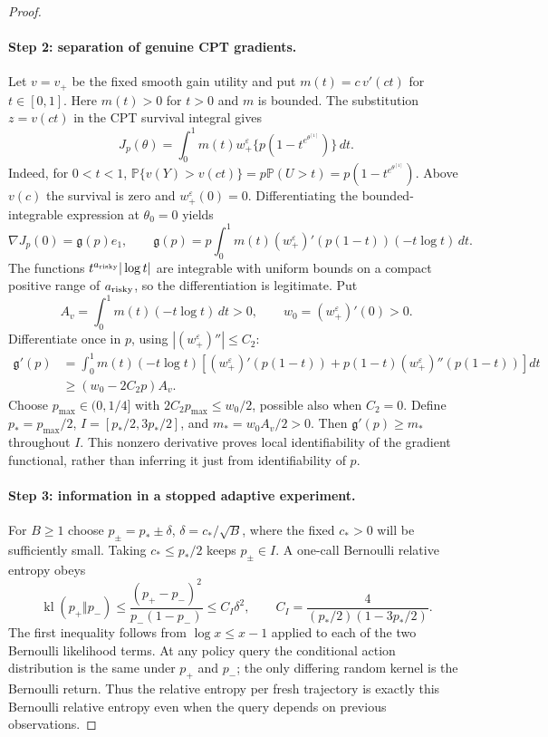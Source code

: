\documentclass[11pt]{article}
\newcommand{\Pp}{\mathbb P}
\newcommand{\1}{\mathbf 1}
\newcommand{\eps}{\varepsilon}
\begin{document}
\begin{proof}
\paragraph{Step 2: separation of genuine CPT gradients.}
Let $v=v_+$ be the fixed smooth gain utility and put $m(t)=c\,v'(ct)$ for $t\in[0,1]$. Here $m(t)>0$ for $t>0$ and $m$ is bounded. The substitution $z=v(ct)$ in the CPT survival integral gives
\begin{equation}\label{eq:submodel-cpt}
 J_p(\theta)=\int_0^1 m(t)w_+^\eps\{p(1-t^{e^{\theta^{[1]}}})\}\,dt.
\end{equation}
Indeed, for $0<t<1$, $\Pp\{v(Y)>v(ct)\}=p\Pp(U>t)=p(1-t^{e^{\theta^{[1]}}})$. Above $v(c)$ the survival is zero and $w_+^\eps(0)=0$. Differentiating the bounded-integrable expression at $\theta_0=0$ yields
\begin{equation}\label{eq:submodel-gradient}
 \nabla J_p(0)=\mathfrak g(p)e_1,\qquad
 \mathfrak g(p)=p\int_0^1m(t)(w_+^\eps)'(p(1-t))(-t\log t)\,dt.
\end{equation}
The functions $t^{a_{\rm risky}}|\log t|$ are integrable with uniform bounds on a compact positive range of $a_{\rm risky}$, so the differentiation is legitimate. Put
\[
 A_v=\int_0^1m(t)(-t\log t)\,dt>0,
 \qquad w_0=(w_+^\eps)'(0)>0.
\]
Differentiate once in $p$, using $|(w_+^\eps)''|\le C_2$:
\begin{align*}
 \mathfrak g'(p)&=\int_0^1m(t)(-t\log t)
 [(w_+^\eps)'(p(1-t))+p(1-t)(w_+^\eps)''(p(1-t))]dt\\
 &\ge (w_0-2C_2p)A_v.
\end{align*}
Choose $p_{\max}\in(0,1/4]$ with $2C_2p_{\max}\le w_0/2$, possible also when $C_2=0$. Define $p_*=p_{\max}/2$, $I=[p_*/2,3p_*/2]$, and $m_*=w_0 A_v/2>0$. Then $\mathfrak g'(p)\ge m_*$ throughout $I$. This nonzero derivative proves local identifiability of the gradient functional, rather than inferring it just from identifiability of $p$.

\paragraph{Step 3: information in a stopped adaptive experiment.}
For $B\ge1$ choose $p_\pm=p_*\pm\delta$, $\delta=c_*/\sqrt B$, where the fixed $c_*>0$ will be sufficiently small. Taking $c_*\le p_*/2$ keeps $p_\pm\in I$. A one-call Bernoulli relative entropy obeys
\[
 \operatorname{kl}(p_+\Vert p_-)
 \le\frac{(p_+-p_-)^2}{p_-(1-p_-)}
 \le C_I\delta^2,
 \qquad C_I=\frac{4}{(p_*/2)(1-3p_*/2)}.
\]
The first inequality follows from $\log x\le x-1$ applied to each of the two Bernoulli likelihood terms. At any policy query the conditional action distribution is the same under $p_+$ and $p_-$; the only differing random kernel is the Bernoulli return. Thus the relative entropy per fresh trajectory is exactly this Bernoulli relative entropy even when the query depends on previous observations.


\end{proof}
\end{document}
